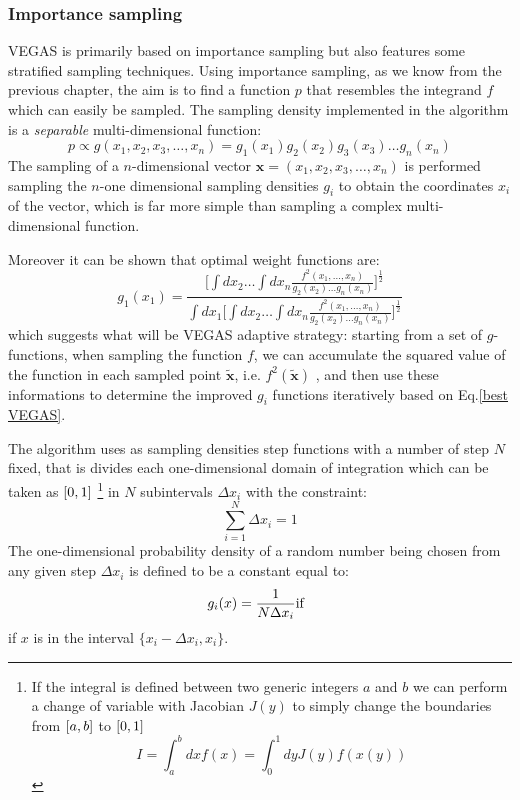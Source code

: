 \documentclass[../main/main.tex]{subfiles}
\begin{document}
\subsubsection{Importance sampling}
VEGAS is primarily based on importance sampling but also features some stratified sampling techniques.
Using importance sampling, as we know from the previous chapter, the aim is to find a function $p$  that resembles the integrand $f$ which can easily be sampled. The sampling density implemented in the algorithm is a \emph{separable} multi-dimensional function:
\begin{equation}
	p \propto g(x_1,x_2,x_3,\dots,x_n) = g_1(x_1)g_2(x_2)g_3(x_3)\dots g_n(x_n)
\end{equation}
The sampling of a $n$-dimensional vector $\textbf{x}=(x_1,x_2,x_3,\dots,x_n)$ is performed sampling the $n$-one dimensional sampling densities
$g_i$ to obtain the coordinates $x_i$ of the vector, which is far more simple than sampling a complex multi-dimensional function.

Moreover it can be shown \cite{Lepage:1977sw, Press:1989vk} that optimal weight functions are:
\begin{equation}
	\label{best VEGAS}
	 g_1(x_1) = \frac{\displaystyle \bigg[ \int dx_2 \dots \int dx_n \frac{f^2(x_1,\dots,x_n)}{g_2(x_2)\dots g_n(x_n) }\bigg]^\frac{1}{2}} { \displaystyle
	 	\int dx_1\bigg[ \int dx_2 \dots \int dx_n \frac{f^2(x_1,\dots,x_n)}{g_2(x_2)\dots g_n(x_n) }\bigg]^\frac{1}{2}}
\end{equation}
which suggests what will be VEGAS adaptive strategy: starting from a set of $g$-functions, when sampling the function $f$,  we can accumulate the
squared value of the function in each sampled point $\tilde{\textbf{x}}$, i.e. $f^2(\tilde{\textbf{x}})$ , and then use these informations 
to determine  the improved  $g_i$  functions iteratively based on Eq.\eqref{best VEGAS}.

The algorithm uses as sampling densities step functions with a number of step $N$ fixed, that is divides each one-dimensional domain of integration which can be taken as $\interval{0}{1}$ \footnote{If the integral is defined between two generic integers $a$ and $b$ we can perform a change of variable with Jacobian $J(y)$ to simply change the boundaries from $\interval{a}{b}$ to $\interval{0}{1}$
\begin{equation}
	I = \int_a^b dx  f(x) = \int_0^1 dy J(y)f(x(y)) 
\end{equation}}
 in $N$ subintervals $\Delta x_i$ with the constraint:
\begin{equation}
	\sum_{i=1}^N \Delta x_i = 1
\end{equation}
The one-dimensional probability density of a random number being chosen from any given step $\Delta x_i$ is defined to be a constant equal to:
\begin{equation}
	g_i(x) = \frac{1}{N \Delta x_i} \text{if} \hspace{0.2cm}
\end{equation}
if $x$ is in the interval  $\{x_i - \Delta x_i, x_i \}$.
\end{document}
